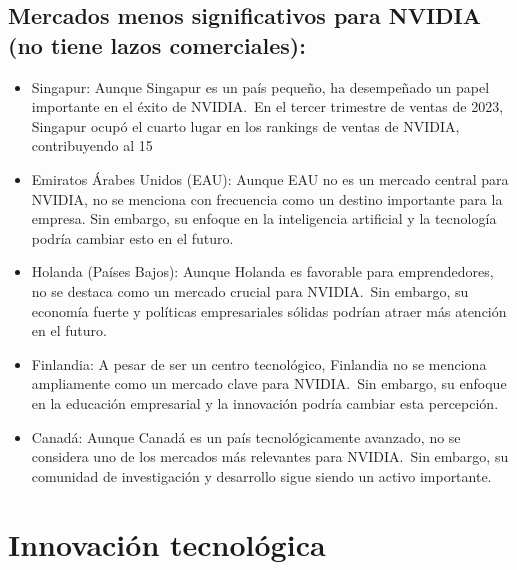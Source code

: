 \documentclass[twocolumn, 12pt]{article}
\begin{document}
\subsection*{Mercados menos significativos para NVIDIA (no tiene lazos comerciales):}

\begin{itemize}
      \item Singapur:
            Aunque Singapur es un país pequeño, ha desempeñado un
            papel importante en el éxito de NVIDIA.~En el tercer trimestre de
            ventas de 2023, Singapur ocupó el cuarto lugar en los rankings de ventas
            de NVIDIA, contribuyendo al 15%

      \item Emiratos Árabes Unidos (EAU):
            Aunque EAU no es un mercado central
            para NVIDIA, no se menciona con frecuencia como un destino importante
            para la empresa. Sin embargo, su enfoque en la inteligencia artificial y
            la tecnología podría cambiar esto en el futuro.

      \item Holanda (Países Bajos):
            Aunque Holanda es favorable para
            emprendedores, no se destaca como un mercado crucial para NVIDIA.~Sin
            embargo, su economía fuerte y políticas empresariales sólidas podrían
            atraer más atención en el futuro.

      \item Finlandia:
            A pesar de ser un centro tecnológico, Finlandia no se
            menciona ampliamente como un mercado clave para NVIDIA.~Sin embargo,
            su enfoque en la educación empresarial y la innovación podría
            cambiar esta percepción.

      \item Canadá:
            Aunque Canadá es un país tecnológicamente avanzado, no se
            considera uno de los mercados más relevantes para NVIDIA.~Sin embargo, su
            comunidad de investigación y desarrollo sigue siendo un activo importante.

\end{itemize}

\section{Innovación tecnológica}
\end{document}
